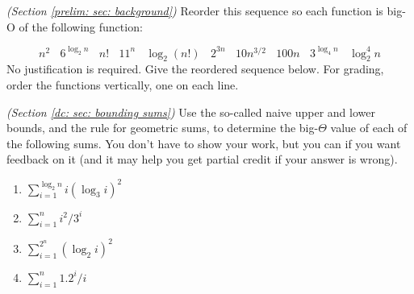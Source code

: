 \documentclass[11pt]{article}
\renewcommand{\inputAnswer}[1]{}
\begin{document}





\newpage 

{\small
\problem \emph{(Section \ref{prelim: sec: background})}
Reorder this sequence so each function is big-O of the following function:
\newcommand{\sep}{~~~~}

\[
  n^2
  \sep
  6^{\log_2 n}
  \sep 
  n!
  \sep 
  11^n
  \sep 
  \log_2 (n!)  
  \sep 
  2^{3n}
  \sep 
  10 n^{3/2}
  \sep 
  100 n
  \sep 
  3^{\log_4 n}
  \sep 
  \log_2^4 n
\]
No justification is required.  Give the reordered sequence below.  For grading, order the functions vertically, one on each line.
}

\setlength{\ITEMHT}{0.45in}
\injectEnumerateBlue 

\inputAnswer{problem_1_answer}

\restoreEnumerateBlue




\newpage 
{\small
\problem \emph{(Section \ref{dc: sec: bounding sums})}
Use the so-called naive upper and lower bounds, and the rule for geometric sums,
to determine the big-$\Theta$ value of each of the following sums.
You don't have to show your work,
but you can if you want feedback on it
(and it may help you get partial credit if your answer is wrong). 

\begin{enumerate}[label=(\alph*)]

\item $\displaystyle\sum_{i=1}^{\log_2 n} i(\log_3 i)^2$

\item $\displaystyle\sum_{i=1}^{n} i^2/3^i$

\item $\displaystyle\sum_{i=1}^{2^n} (\log_2 i)^2$
  
\item $\displaystyle\sum_{i=1}^n 1.2^i/i$

\end{enumerate}
}
\end{document}
